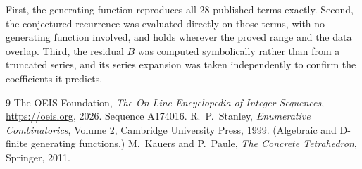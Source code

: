 \documentclass[11pt,a4paper]{article}
\theoremstyle{plain}
\theoremstyle{definition}
\begin{document}
First, the generating function reproduces all $28$ published terms exactly. Second,
the conjectured recurrence was evaluated directly on those terms, with no generating function
involved, and holds wherever the proved range and the data overlap. Third, the residual $B$ was
computed symbolically rather than from a truncated series, and its series expansion was taken
independently to confirm the coefficients it predicts.

\begin{thebibliography}{9}
 The OEIS Foundation, \emph{The On-Line Encyclopedia of Integer Sequences},
\url{https://oeis.org}, 2026. Sequence A174016.
 R.~P.~Stanley, \emph{Enumerative Combinatorics}, Volume 2, Cambridge
University Press, 1999. (Algebraic and D-finite generating functions.)
 M.~Kauers and P.~Paule, \emph{The Concrete Tetrahedron}, Springer, 2011.
\end{thebibliography}
\end{document}

